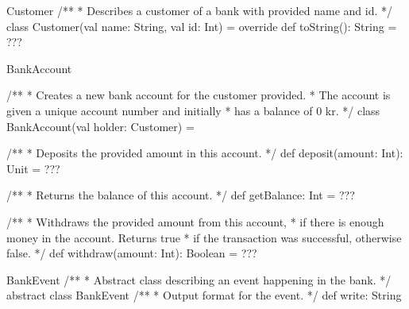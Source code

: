 \begin{ScalaSpec}{Customer}
/**
 * Describes a customer of a bank with provided name and id.
 */
class Customer(val name: String, val id: Int) = {
	override def toString(): String = ???
}

\end{ScalaSpec}


\begin{ScalaSpec}{BankAccount}

/**
 * Creates a new bank account for the customer provided.
 * The account is given a unique account number and initially
 * has a balance of 0 kr.
 */
class BankAccount(val holder: Customer) = {

  /**
   * Deposits the provided amount in this account.
   */
  def deposit(amount: Int): Unit = ???

  /**
   * Returns the balance of this account.
   */
  def getBalance: Int = ???

  /**
   * Withdraws the provided amount from this account,
   * if there is enough money in the account. Returns true
   * if the transaction was successful, otherwise false. 
   */
  def withdraw(amount: Int): Boolean = ???

}
\end{ScalaSpec}


\begin{ScalaSpec}{BankEvent}
/**
 * Abstract class describing an event happening in the bank.
 */
abstract class BankEvent {   
  /**
   * Output format for the event.
   */
  def write: String
}

\end{ScalaSpec}


